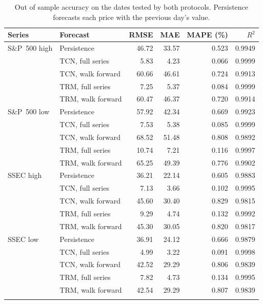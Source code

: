 \begin{table}[ht]
\caption{Out of sample accuracy on the dates tested by both protocols. Persistence forecasts each price with the previous day's value.}
\label{tab:accuracy}
\centering
\begin{tabular}{@{}llrrrr@{}}
\toprule
Series & Forecast & RMSE & MAE & MAPE (\%) & $R^2$ \\
\midrule
S\&P~500 high & Persistence & 46.72 & 33.57 & 0.523 & 0.9949 \\
 & TCN, full series & 5.83 & 4.23 & 0.066 & 0.9999 \\
 & TCN, walk forward & 60.66 & 46.61 & 0.724 & 0.9913 \\
 & TRM, full series & 7.25 & 5.37 & 0.084 & 0.9999 \\
 & TRM, walk forward & 60.47 & 46.37 & 0.720 & 0.9914 \\
\midrule
S\&P~500 low & Persistence & 57.92 & 42.34 & 0.669 & 0.9923 \\
 & TCN, full series & 7.53 & 5.38 & 0.085 & 0.9999 \\
 & TCN, walk forward & 68.52 & 51.48 & 0.808 & 0.9892 \\
 & TRM, full series & 10.74 & 7.21 & 0.116 & 0.9997 \\
 & TRM, walk forward & 65.25 & 49.39 & 0.776 & 0.9902 \\
\midrule
SSEC high & Persistence & 36.21 & 22.14 & 0.605 & 0.9883 \\
 & TCN, full series & 7.13 & 3.66 & 0.102 & 0.9995 \\
 & TCN, walk forward & 45.60 & 30.40 & 0.829 & 0.9815 \\
 & TRM, full series & 9.29 & 4.74 & 0.132 & 0.9992 \\
 & TRM, walk forward & 45.30 & 30.05 & 0.820 & 0.9817 \\
\midrule
SSEC low & Persistence & 36.91 & 24.12 & 0.666 & 0.9879 \\
 & TCN, full series & 4.99 & 3.22 & 0.091 & 0.9998 \\
 & TCN, walk forward & 42.52 & 29.29 & 0.806 & 0.9839 \\
 & TRM, full series & 7.82 & 4.73 & 0.134 & 0.9995 \\
 & TRM, walk forward & 42.54 & 29.29 & 0.807 & 0.9839 \\
\botrule
\end{tabular}
\end{table}

